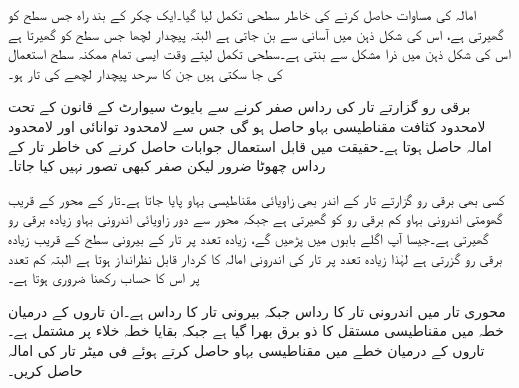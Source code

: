 امالہ کی مساوات حاصل کرنے کی خاطر سطحی تکمل لیا گیا۔ایک چکر کے بند راہ جس سطح کو گھیرتی ہے، اس کی شکل ذہن میں آسانی سے بن جاتی ہے البتہ پیچدار لچھا جس سطح کو گھیرتا ہے اس کی شکل ذہن میں ذرا مشکل سے بنتی ہے۔سطحی تکمل لیتے وقت ایسی تمام ممکنہ سطح استعمال کی جا سکتی ہیں جن کا سرحد پیچدار لچھے کی تار ہو۔

برقی رو گزارتے تار کی رداس صفر کرنے سے بایوٹ سیوارٹ کے قانون کے تحت لامحدود کثافت مقناطیسی بہاو حاصل ہو گی جس سے لامحدود توانائی اور لامحدود امالہ حاصل ہوتا ہے۔حقیقت میں قابل استعمال جوابات حاصل کرنے کی خاطر تار کے رداس  چھوٹا ضرور لیکن صفر کبھی تصور نہیں کیا جاتا۔

کسی بھی برقی رو گزارتے تار کے اندر بھی زاویائی مقناطیسی بہاو پایا جاتا ہے۔تار کے محور کے قریب  گھومتی اندرونی بہاو کم برقی رو کو گھیرتی ہے جبکہ محور سے دور زاویائی اندرونی بہاو زیادہ برقی رو گھیرتی ہے۔جیسا آپ اگلے بابوں میں پڑھیں گے، زیادہ تعدد پر تار کے بیرونی سطح کے قریب زیادہ برقی رو گزرتی ہے لہٰذا زیادہ تعدد پر تار کی اندرونی امالہ کا کردار قابل نظرانداز ہوتا ہے البتہ کم تعدد پر اس کا حساب رکھنا ضروری ہوتا ہے۔

محوری تار میں اندرونی تار کا رداس  جبکہ بیرونی تار کا رداس  ہے۔ان تاروں کے درمیان خطہ  میں  مقناطیسی مستقل کا ذو برق بھرا گیا ہے جبکہ بقایا خطہ خلاء پر مشتمل ہے۔تاروں کے درمیان خطے میں مقناطیسی بہاو حاصل کرتے ہوئے فی میٹر تار کی امالہ حاصل کریں۔


